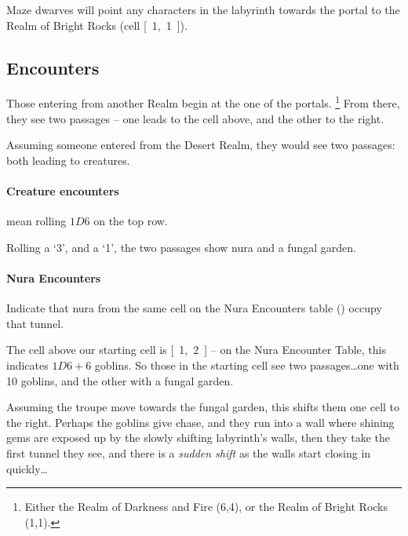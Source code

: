 \begin{multicols}{2}
Maze dwarves will point any characters in the labyrinth towards the portal to the Realm of Bright Rocks (cell \mbox{[ 1, 1 ]}).

\boxPair{
  \umberhulk
}{
  \archmage
}

\subsection{Encounters}
\label{labyrinth}

Those entering from another Realm begin at the one of the portals.
\footnote{Either the Realm of Darkness and Fire (6,4), or the Realm of Bright Rocks (1,1).}
From there, they see two passages -- one leads to the cell above, and the other to the right.

\begin{exampletext}
  Assuming someone entered from the Desert Realm, they would see two passages: both leading to creatures.
\end{exampletext}

\paragraph{Creature encounters}
mean rolling $1D6$ on the top row.

\begin{exampletext}
  Rolling a `3', and a `1', the two passages show nura and a fungal garden.
\end{exampletext}

\jelly

\paragraph{Nura Encounters}
Indicate that nura from the same cell on the Nura Encounters table () occupy that tunnel.

\begin{exampletext}
  The cell above our starting cell is \mbox{[ 1, 2 ]} -- on the Nura Encounter Table, this indicates $1D6+6$ goblins.
  So those in the starting cell see two passages\ldots one with 10 goblins, and the other with a fungal garden.

  Assuming the troupe move towards the fungal garden, this shifts them one cell to the right.
  Perhaps the goblins give chase, and they run into a wall where shining gems are exposed up by the slowly shifting labyrinth's walls, then they take the first tunnel they see, and there is a \textit{sudden shift} as the walls start closing in quickly\ldots
\end{exampletext}


\end{multicols}
